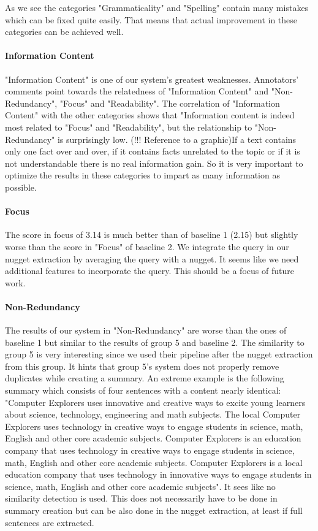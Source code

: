 As we see the categories "Grammaticality" and "Spelling" contain many mistakes which can be fixed quite easily. That means that actual improvement in these categories can be achieved well.

\paragraph{Information Content}
"Information Content" is one of our system's greatest weaknesses. Annotators' comments point towards the relatedness of "Information Content" and "Non-Redundancy", "Focus" and "Readability". The correlation of "Information Content" with the other categories shows that "Information content is indeed most related to "Focus" and "Readability", but the relationship to "Non-Redundancy" is surprisingly low. (!!! Reference to a graphic)If a text contains only one fact over and over, if it contains facts unrelated to the topic or if it is not understandable there is no real information gain. So it is very important to optimize the results in these categories to impart as many information as possible.

\paragraph{Focus}
The score in focus of 3.14 is much better than of baseline 1 (2.15) but slightly worse than the score in "Focus" of baseline 2. We integrate the query in our nugget extraction by averaging the query with a nugget. It seems like we need additional features to incorporate the query. This should be a focus of future work.

\paragraph{Non-Redundancy}
The results of our system in "Non-Redundancy" are worse than the ones of baseline 1 but similar to the results of group 5 and baseline 2. The similarity to group 5 is very interesting since we used their pipeline after the nugget extraction from this group. It hints that group 5's system does not properly remove duplicates while creating a summary. An extreme example is the following summary which consists of four sentences with a content nearly identical: "Computer Explorers uses innovative and creative ways to excite young learners about science, technology, engineering and math subjects. The local Computer Explorers uses technology in creative ways to engage students in science, math, English and other core academic subjects. Computer Explorers is an education company that uses technology in creative ways to engage students in science, math, English and other core academic subjects. Computer Explorers is a local education company that uses technology in innovative ways to engage students in science, math, English and other core academic subjects". It sees like no similarity detection is used. This does not necessarily have to be done in summary creation but can be also done in the nugget extraction, at least if full sentences are extracted.

